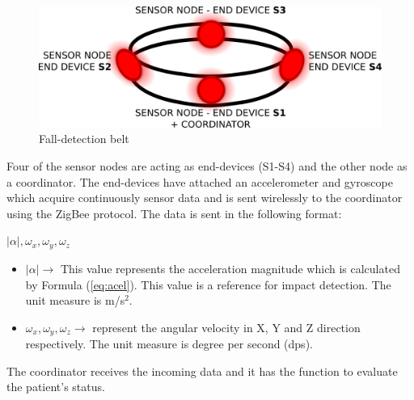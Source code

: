 \documentclass[journal]{IEEEtran}
\begin{document}
\begin{figure}[!ht]
  \centering
  \includegraphics[scale=0.2]{./img/belt}
  \caption[Fall-detection belt]{Fall-detection belt~\cite{LaBlunda.2016,LaBlunda.2016b}}
  \label{fig:belt}
\end{figure}

Four of the sensor nodes are acting as end-devices (S1-S4) and the other node as a coordinator. 
The end-devices have attached an accelerometer and gyroscope which acquire continuously sensor 
data and is sent wirelessly to the coordinator using the ZigBee protocol. The data is sent in the following format:
 \begin{center}
  $|\alpha|, \omega_{x}, \omega_{y}, \omega_{z}$
 \end{center}
\begin{itemize}
  \item $|\alpha| \rightarrow$ This value
    represents the acceleration magnitude which is calculated by Formula (\ref{eq:acel}). 
    This value is a reference for impact detection. The unit measure is m/s$^2$.
  \item $\omega_{x}, \omega_{y}, \omega_{z} \rightarrow$ represent the angular velocity in X, Y and Z direction respectively. The unit measure is degree per second (dps).
\end{itemize}
The coordinator receives the incoming data and it has the function to evaluate the patient's status.
\end{document}
